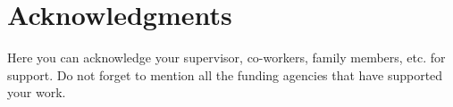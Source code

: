 \chapter*{Acknowledgments}

\begin{justify}
    Here you can acknowledge your supervisor, co-workers, family members, etc. for support.  Do not forget to mention all the funding agencies that have supported your work.
\end{justify}

\clearpage
